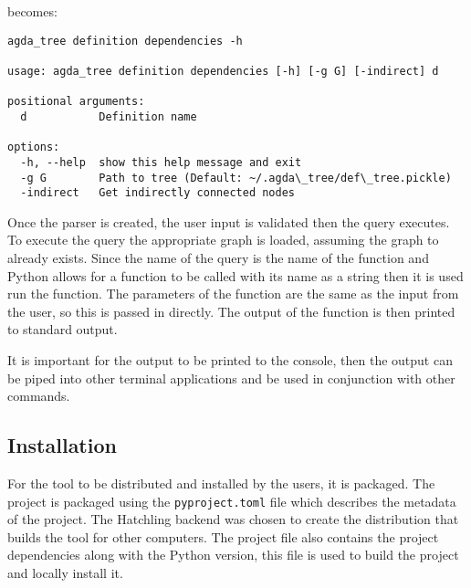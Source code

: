 becomes:

\begin{lstlisting}
agda_tree definition dependencies -h

usage: agda_tree definition dependencies [-h] [-g G] [-indirect] d

positional arguments:
  d           Definition name

options:
  -h, --help  show this help message and exit
  -g G        Path to tree (Default: ~/.agda\_tree/def\_tree.pickle)
  -indirect   Get indirectly connected nodes
\end{lstlisting}

Once the parser is created, the user input is validated then the query
executes. To execute the query the appropriate graph is loaded, assuming the
graph to already exists. Since the name of the query is the name of the
function and Python allows for a function to be called with its name as a
string then it is used run the function. The parameters of the function are the
same as the input from the user, so this is passed in directly. The output of
the function is then printed to standard output.

It is important for the output to be printed to the console, then the
output can be piped into other terminal applications and be used in conjunction
with other commands.


\subsection{Installation} \label{sub:Agda Tree Installation}

For the tool to be distributed and installed by the users, it is packaged. The
project is packaged using the \texttt{pyproject.toml} file which describes
the metadata of the project. The Hatchling backend was chosen to create the
distribution that builds the tool for other computers. The
project file also contains the project dependencies along with the Python
version, this file is used to build the project and locally install it.

